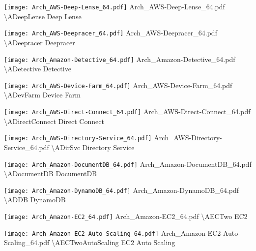  {\texttt{[image: Arch\_AWS-Deep-Lense\_64.pdf]}} {Arch\_AWS-Deep-Lense\_64.pdf} {{\textbackslash}ADeepLense} {Deep Lense}

 {\texttt{[image: Arch\_AWS-Deepracer\_64.pdf]}} {Arch\_AWS-Deepracer\_64.pdf} {{\textbackslash}ADeepracer} {Deepracer}

 {\texttt{[image: Arch\_Amazon-Detective\_64.pdf]}} {Arch\_Amazon-Detective\_64.pdf} {{\textbackslash}ADetective} {Detective}

 {\texttt{[image: Arch\_AWS-Device-Farm\_64.pdf]}} {Arch\_AWS-Device-Farm\_64.pdf} {{\textbackslash}ADevFarm} {Device Farm}

 {\texttt{[image: Arch\_AWS-Direct-Connect\_64.pdf]}} {Arch\_AWS-Direct-Connect\_64.pdf} {{\textbackslash}ADirectConnect} {Direct Connect}

 {\texttt{[image: Arch\_AWS-Directory-Service\_64.pdf]}} {Arch\_AWS-Directory-Service\_64.pdf} {{\textbackslash}ADirSvc} {Directory Service}

 {\texttt{[image: Arch\_Amazon-DocumentDB\_64.pdf]}} {Arch\_Amazon-DocumentDB\_64.pdf} {{\textbackslash}ADocumentDB} {DocumentDB}

 {\texttt{[image: Arch\_Amazon-DynamoDB\_64.pdf]}} {Arch\_Amazon-DynamoDB\_64.pdf} {{\textbackslash}ADDB} {DynamoDB}

 {\texttt{[image: Arch\_Amazon-EC2\_64.pdf]}} {Arch\_Amazon-EC2\_64.pdf} {{\textbackslash}AECTwo} {EC2}

 {\texttt{[image: Arch\_Amazon-EC2-Auto-Scaling\_64.pdf]}} {Arch\_Amazon-EC2-Auto-Scaling\_64.pdf} {{\textbackslash}AECTwoAutoScaling} {EC2 Auto Scaling}

